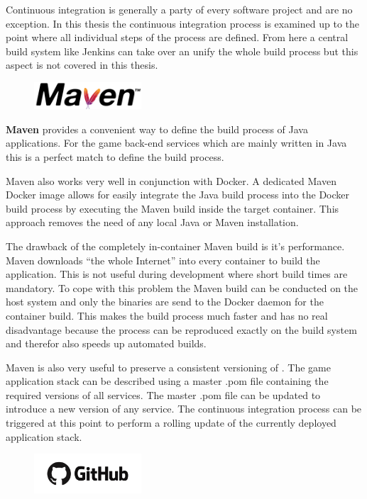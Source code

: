 Continuous integration is generally a party of every software project and \og{}
are no exception. In this thesis the continuous integration process is examined
up to the point where all individual steps of the process are defined. From here
a central build system like Jenkins can take over an unify the whole build
process but this aspect is not covered in this thesis.\\

\begin{figure}
    \includegraphics[width=4cm]{images/dependencies/maven}
\end{figure}

\textbf{Maven} provides a convenient way to define the build process of Java
applications. For the game back-end services which are mainly written in Java
this is a perfect match to define the build process.

Maven also works very well in conjunction with Docker. A dedicated Maven Docker
image allows for easily integrate the Java build process into the Docker build
process by executing the Maven build inside the target container. This approach
removes the need of any local Java or Maven installation. 

The drawback of the completely in-container Maven build is it's performance.
Maven downloads ``the whole Internet'' into every container to build the
application. This is not useful during development where short build times are
mandatory. To cope with this problem the Maven build can be conducted on the
host system and only the binaries are send to the Docker daemon for the
container build. This makes the build process much faster and has no real
disadvantage because the process can be reproduced exactly on the build system
and therefor also speeds up automated builds.

Maven is also very useful to preserve a consistent versioning of \mss{}. The
game application stack can be described using a master .pom file containing
the required versions of all services. The master .pom file can be updated to
introduce a new version of any service. The continuous integration process can
be triggered at this point to perform a rolling update of the currently
deployed application stack.\\
	
\begin{figure}
    \includegraphics[width=4cm]{images/dependencies/github}
\end{figure}

